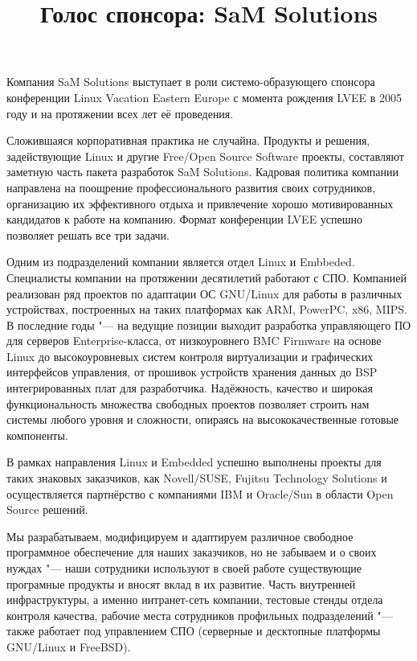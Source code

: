 \documentclass[10pt, a5paper]{article}
\begin{document}
\title{Голос спонсора: SaM Solutions}
\date{}
\maketitle

Компания SaM Solutions выступает в роли системо-образующего спонсора конференции Linux Vacation Eastern Europe с момента рождения LVEE в 2005 году и на протяжении всех лет её проведения. 

Сложившаяся корпоративная практика не случайна. Продукты и решения, задействующие Linux и другие Free/Open Source Software проекты, составляют заметную часть пакета разработок SaM Solutions. Кадровая политика компании направлена на поощрение профессионального развития своих сотрудников, организацию их эффективного отдыха и привлечение хорошо мотивированных кандидатов к работе на компанию. Формат конференции LVEE успешно позволяет решать все три задачи. 

Одним из подразделений компании является отдел Linux и \linebreak Embbeded. Специалисты компании на протяжении десятилетий работают с СПО. Компанией реализован ряд проектов по адаптации ОС GNU/Linux для работы в различных устройствах, построенных на таких платформах как ARM, PowerPC, x86, MIPS. В последние годы "--- на ведущие позиции выходит разработка управляющего ПО для серверов Enterprise-класса, от низкоуровнего BMC Firmware на основе Linux до высокоуровневых систем контроля виртуализации и графических интерфейсов управления, от прошивок устройств хранения данных до BSP интегрированных плат для разработчика. Надёжность, качество и широкая функциональность множества свободных проектов позволяет строить нам системы любого уровня и сложности, опираясь на высококачественные готовые компоненты.

В рамках направления Linux и Embedded успешно выполнены проекты для таких знаковых заказчиков, как  Novell/SUSE, Fujitsu Technology Solutions  и осуществляется партнёрство с компаниями IBM и Oracle/Sun в области Open Source решений.

Мы разрабатываем, модифицируем и адаптируем различное свободное программное обеспечение для наших заказчиков, но не забываем и о своих нуждах "--- наши сотрудники используют в своей работе существующие програмные продукты и вносят вклад в их развитие. Часть внутренней инфраструктуры, а именно интранет-сеть компании, тестовые стенды отдела контроля качества, рабочие места сотрудников профильных подразделений "--- также работает под управлением СПО (серверные и десктопные платформы GNU/Linux и FreeBSD). 
\end{document}
